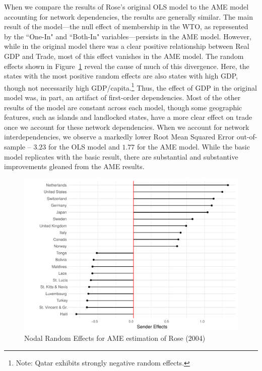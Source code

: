 When we compare the results of Rose's original OLS model to the AME model accounting for network dependencies, the results are generally similar. The main result of the model---the null effect of membership in the WTO, as represented by the ``One-In" and ``Both-In" variables---persists in the AME model. However, while in the original model there was a clear positive relationship between Real GDP and Trade, most of this effect vanishes in the AME model. The random effects shown in Figure~\ref{fig:roser} reveal the cause of much of this divergence. Here, the states with the most positive random effects are also states with high GDP, though not necessarily high GDP/capita.\footnote{Note: Qatar exhibits strongly negative random effects.} Thus, the effect of GDP in the original model was, in part, an artifact of first-order dependencies. Most of the other results of the model are constant across each model, though some geographic features, such as islands and landlocked states, have a more clear effect on trade once we account for these network dependencies. When we account for network interdependencies, we observe a markedly lower Root Mean Squared Error out-of-sample -- $3.23$ for the OLS model and $1.77$ for the AME model. While the basic model replicates with the basic result, there are substantial and substantive improvements gleaned from the AME results.

\begin{figure}
\includegraphics[width=\textwidth]{rose_aeff_top10.pdf}
 \caption{Nodal Random Effects for AME estimation of Rose (2004)}\label{fig:roser}
\end{figure}
\FloatBarrier

